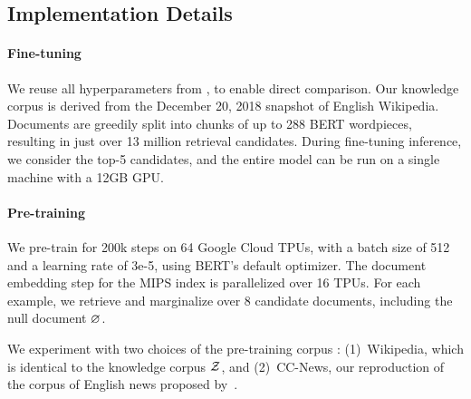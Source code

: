 \documentclass{article}
\begin{document}
 
\subsection{Implementation Details}
\paragraph{Fine-tuning}
We reuse all hyperparameters from \citet{orqa}, to enable direct comparison. Our knowledge corpus is derived from the December 20, 2018 snapshot of English Wikipedia. Documents are greedily split into chunks of up to 288 BERT wordpieces, resulting in just over 13 million retrieval candidates. During fine-tuning inference, we consider the top-5 candidates, and the entire model can be run on a single machine with a 12GB GPU.

\paragraph{Pre-training}
We pre-train for 200k steps on 64 Google Cloud TPUs, with a batch size of 512 and a learning rate of 3e-5, using BERT's default optimizer. The document embedding step for the MIPS index is parallelized over 16 TPUs. For each example, we retrieve and marginalize over 8 candidate documents, including the null document $\varnothing$.

We experiment with two choices of the pre-training corpus \target:
(1)~Wikipedia, which is identical to the knowledge corpus $\mathcal{Z}$, and (2)~CC-News, our reproduction of the corpus of English news proposed by~\citet{roberta}.
\end{document}
